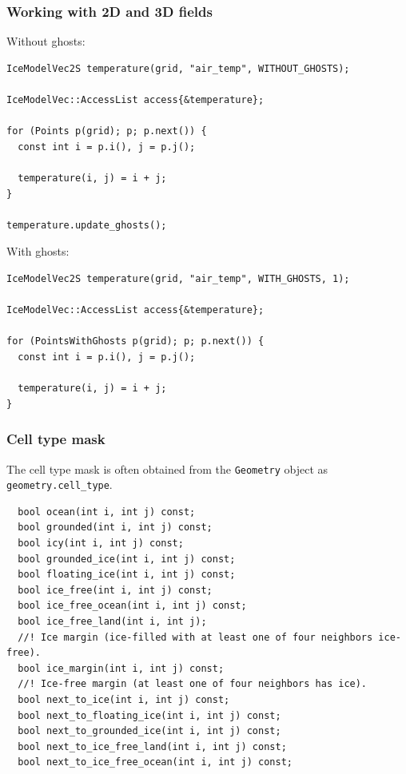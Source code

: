 \documentclass[hide notes,intlimits]{beamer}
\begin{document}
\begin{frame}[fragile]
  \frametitle{Working with 2D and 3D fields}

  Without ghosts:
\begin{lstlisting}
IceModelVec2S temperature(grid, "air_temp", WITHOUT_GHOSTS);

IceModelVec::AccessList access{&temperature};

for (Points p(grid); p; p.next()) {
  const int i = p.i(), j = p.j();

  temperature(i, j) = i + j;
}

temperature.update_ghosts();
\end{lstlisting}

  With ghosts:

\begin{lstlisting}
IceModelVec2S temperature(grid, "air_temp", WITH_GHOSTS, 1);

IceModelVec::AccessList access{&temperature};

for (PointsWithGhosts p(grid); p; p.next()) {
  const int i = p.i(), j = p.j();

  temperature(i, j) = i + j;
}
\end{lstlisting}

\end{frame}

\begin{frame}[fragile]
  \frametitle{Cell type mask}

  The cell type mask is often obtained from the \texttt{Geometry}
  object as \texttt{geometry.cell\_type}.

  \medskip
\begin{lstlisting}
  bool ocean(int i, int j) const;
  bool grounded(int i, int j) const;
  bool icy(int i, int j) const;
  bool grounded_ice(int i, int j) const;
  bool floating_ice(int i, int j) const;
  bool ice_free(int i, int j) const;
  bool ice_free_ocean(int i, int j) const;
  bool ice_free_land(int i, int j);
  //! Ice margin (ice-filled with at least one of four neighbors ice-free).
  bool ice_margin(int i, int j) const;
  //! Ice-free margin (at least one of four neighbors has ice).
  bool next_to_ice(int i, int j) const;
  bool next_to_floating_ice(int i, int j) const;
  bool next_to_grounded_ice(int i, int j) const;
  bool next_to_ice_free_land(int i, int j) const;
  bool next_to_ice_free_ocean(int i, int j) const;

\end{lstlisting}
\end{frame}
\end{document}
